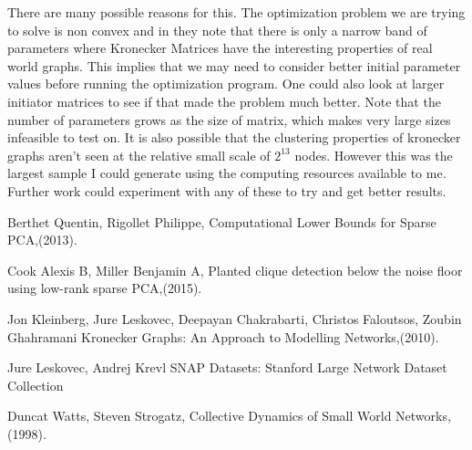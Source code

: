 \documentclass[dvips,12pt]{article}
\begin{document}
There are many possible reasons for this. The optimization problem we are trying to solve is non convex and in \cite{ghahramani2010} they note that there is only a narrow band of parameters where Kronecker Matrices have the interesting properties of real world graphs. This implies that we may need to consider better initial parameter values before running the optimization program. One could also look at larger initiator matrices to see if that made the problem much better. Note that the number of parameters grows as the size of matrix, which makes very large sizes infeasible to test on. It is also possible that the clustering properties of kronecker graphs aren't seen at the relative small scale of $2^{13}$ nodes. However this was the largest sample I could generate using the computing resources available to me. Further work could experiment with any of these to try and get better results.

\newpage

\begin{thebibliography}{99}


Berthet Quentin,	
Rigollet Philippe,	
{Computational Lower Bounds for Sparse PCA},(2013).

Cook Alexis B,	
Miller Benjamin A,
{Planted clique detection below the noise floor using low-rank sparse PCA},(2015).

Jon Kleinberg,
Jure Leskovec,
Deepayan Chakrabarti,
Christos Faloutsos,
Zoubin Ghahramani
{Kronecker Graphs: An Approach to Modelling Networks},(2010).

Jure Leskovec,
Andrej Krevl
{{SNAP Datasets}: {Stanford} Large Network Dataset Collection}

Duncat Watts,
Steven Strogatz,
{Collective Dynamics of Small World Networks},(1998).




\end{thebibliography}
\end{document}
